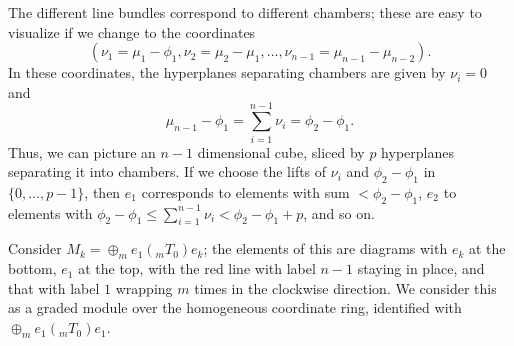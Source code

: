 The different line bundles correspond to different chambers; these are easy to visualize if we change to the coordinates \[(\nu_1=\mu_1-\phi_1,\nu_2=\mu_2-\mu_1,\dots, \nu_{n-1}=\mu_{n-1}-\mu_{n-2}).\]  In these coordinates, the hyperplanes separating chambers are given by $\nu_i=0$ and \[\mu_{n-1}-\phi_1=\sum_{i=1}^{n-1}\nu_i=\phi_2-\phi_1.\]  Thus, we can picture an $n-1$ dimensional cube, sliced by $p$ hyperplanes separating it into chambers.  If we choose the lifts of $\nu_i$ and $\phi_2-\phi_1$ in $\{0,\dots, p-1\}$,  then $e_{1}$ corresponds to elements with sum $<\phi_2-\phi_1$, $e_{2}$ to elements with $\phi_2-\phi_1\leq \sum_{i=1}^{n-1}\nu_i< \phi_2-\phi_1+p$, and so on.  


Consider $M_k=\oplus_{m}e_1({}_{m}T_{0})e_k$; the elements of this are diagrams with $e_k$ at the bottom, $e_1$ at the top, with the red line with label $n-1$ staying in place, and that with label $1$ wrapping $m$ times in the clockwise direction.  We consider this as a graded module over the homogeneous coordinate ring, identified with $\oplus_{m}e_1({}_{m}T_{0})e_1$.

